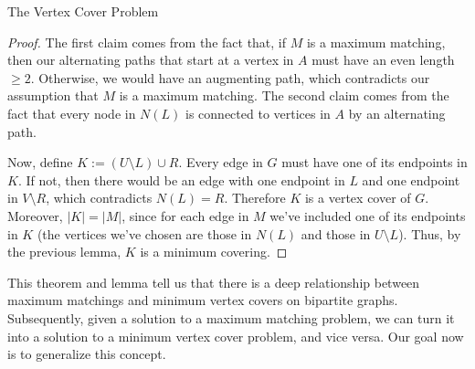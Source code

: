 \begin{section}{The Vertex Cover Problem}
\begin{proof}
		The first claim comes from the fact that, if $M$ is a 
		maximum matching, then our alternating paths that start at a vertex in $A$ must have 
		an even length $\geq 2$. Otherwise, we would have an augmenting path, 
		which contradicts our assumption that $M$ is a maximum matching.
		The second claim comes from the fact that every node in $N(L)$ is connected to vertices 
		in $A$ by an alternating path. 

		Now, define $K := (U\setminus L)\cup R$. Every edge 
		in $G$ must have one of its endpoints in $K$. If not, then there would be an 
		edge with one endpoint in $L$ and one endpoint in $V\setminus R$, which contradicts 
		$N(L) = R$. Therefore $K$ is a vertex cover of $G$. Moreover, $|K| = |M|$, since for each 
		edge in $M$ we've included one of its endpoints in $K$ (the vertices we've chosen are 
		those in $N(L)$ and those in $U\setminus L$). Thus, by the previous lemma, $K$ is 
		a minimum covering.
	\end{proof}

	This theorem and lemma tell us that there is a deep relationship between maximum matchings and 
	minimum vertex covers on bipartite graphs. Subsequently, given a solution to a maximum matching 
	problem, we can turn it into a solution to a minimum vertex cover problem, and vice versa. Our 
	goal now is to generalize this concept.
\end{section}

